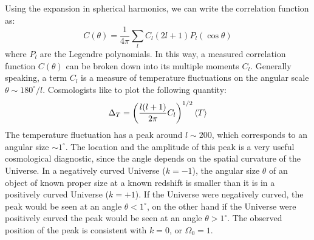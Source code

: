 \documentclass[10.75pt,a4paper,openright,bottom=2cm]{article}
\begin{document}
Using the expansion in spherical harmonics, we can write the correlation function as:
\[
C(\theta)=\frac{1}{4\pi}\sum_lC_l(2l+1)P_l(\cos\theta)
\]
where $P_l$ are the Legendre polynomials. In this way, a measured correlation function $C(\theta)$ can be broken down into its multiple moments $C_l$. Generally speaking, a term $C_l$ is
a measure of temperature fluctuations on the angular scale $\theta\sim180^\circ/l$. Cosmologists like to plot the following quantity:
\[
\Delta_T=\left(\frac{l(l+1)}{2\pi}C_l\right)^{1/2}\Braket{T}
\]
The temperature fluctuation has a peak around $l\sim200$, which corresponds to an angular size $\sim1^\circ$. The location and the amplitude of this peak is a very useful cosmological diagnostic, since the angle depends on the spatial curvature of the Universe. In a negatively curved Universe ($k=-1$), the angular size $\theta$ of an object of known proper size at a known redshift is smaller than it is in a positively curved Universe ($k=+1$). If the Universe were negatively curved, the peak would be seen at an angle $\theta<1^\circ$, on the other hand if the Universe were positively curved the peak would be seen at an angle $\theta>1^\circ$. The observed position of the peak is consistent with $k=0$, or $\Omega_0=1$.
\newpage
\end{document}
